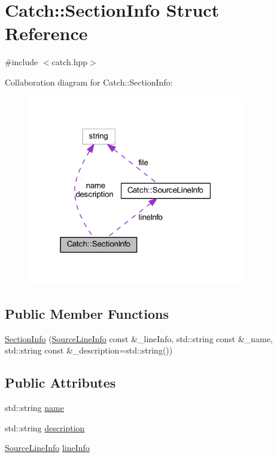 \hypertarget{struct_catch_1_1_section_info}{}\section{Catch\+:\+:Section\+Info Struct Reference}
\label{struct_catch_1_1_section_info}


{\ttfamily \#include $<$catch.\+hpp$>$}



Collaboration diagram for Catch\+:\+:Section\+Info\+:\nopagebreak
\begin{figure}[H]
\begin{center}
\leavevmode
\includegraphics[width=268pt]{struct_catch_1_1_section_info__coll__graph}
\end{center}
\end{figure}
\subsection*{Public Member Functions}
\begin{DoxyCompactItemize}
\item 
\hyperlink{struct_catch_1_1_section_info_a27aff3aaf8b6611f3651b17111a272c6}{Section\+Info} (\hyperlink{struct_catch_1_1_source_line_info}{Source\+Line\+Info} const \&\+\_\+line\+Info, std\+::string const \&\+\_\+name, std\+::string const \&\+\_\+description=std\+::string())
\end{DoxyCompactItemize}
\subsection*{Public Attributes}
\begin{DoxyCompactItemize}
\item 
std\+::string \hyperlink{struct_catch_1_1_section_info_a704c8fc662d309137e0d4f199cb7df58}{name}
\item 
std\+::string \hyperlink{struct_catch_1_1_section_info_a0052060219a6de74bb7ade34d4163a4e}{description}
\item 
\hyperlink{struct_catch_1_1_source_line_info}{Source\+Line\+Info} \hyperlink{struct_catch_1_1_section_info_adbc83b8a3507c4acc8ee249e93465711}{line\+Info}
\end{DoxyCompactItemize}


